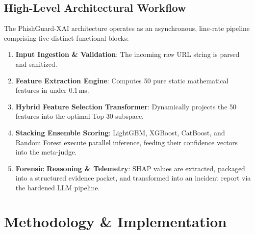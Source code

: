\documentclass[12pt,a4paper,oneside]{report}
\begin{document}
\section{High-Level Architectural Workflow}
The PhishGuard-XAI architecture operates as an asynchronous, line-rate pipeline comprising five distinct functional blocks:
\begin{enumerate}
    \item \textbf{Input Ingestion \& Validation}: The incoming raw URL string is parsed and sanitized.
    \item \textbf{Feature Extraction Engine}: Computes 50 pure static mathematical features in under 0.1\,ms.
    \item \textbf{Hybrid Feature Selection Transformer}: Dynamically projects the 50 features into the optimal Top-30 subspace.
    \item \textbf{Stacking Ensemble Scoring}: LightGBM, XGBoost, CatBoost, and Random Forest execute parallel inference, feeding their confidence vectors into the meta-judge.
    \item \textbf{Forensic Reasoning \& Telemetry}: SHAP values are extracted, packaged into a structured evidence packet, and transformed into an incident report via the hardened LLM pipeline.
\end{enumerate}

\chapter{Methodology \& Implementation}
\end{document}
